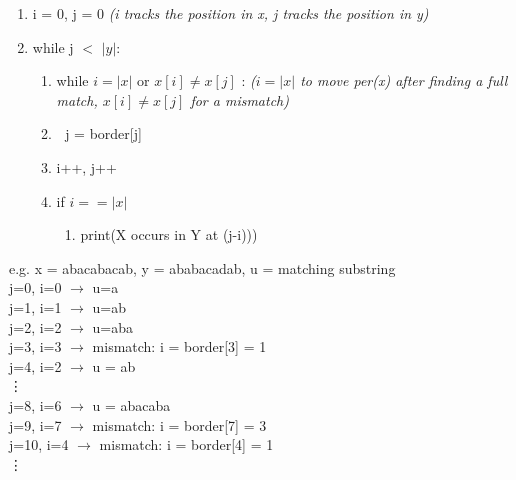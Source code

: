 \begin{enumerate}[label=\Alph*]
    \item i = 0, j = 0 \emph{(i tracks the position in x, j tracks the position in y)}
    \item while j $<$ $|y|$:
\begin{enumerate}[label=\arabic*]
    \item while $i=|x|$ or $x[i]\neq x[j]$ : \emph{($i=|x|$ to move per(x) after finding a full match, $x[i]\neq x[j]$ for a mismatch)}
    \item[ ] $\;$ j = border[j]    
    \item i++, j++
    \item if $i==|x|$
    \begin{enumerate}
        \item print(X occurs in Y at (j-i)))
    \end{enumerate}
\end{enumerate}    
\end{enumerate}
e.g.
x = abacabacab, y = ababacadab, u = matching substring \\
j=0, i=0 $\rightarrow$ u=a \\
j=1, i=1 $\rightarrow$ u=ab \\
j=2, i=2 $\rightarrow$ u=aba \\
j=3, i=3 $\rightarrow$ mismatch: i = border[3] = 1 \\
j=4, i=2 $\rightarrow$ u = ab \\
\vdots \\
j=8, i=6 $\rightarrow$ u = abacaba \\
j=9, i=7  $\rightarrow$ mismatch: i = border[7] = 3 \\
j=10, i=4 $\rightarrow$ mismatch: i = border[4] = 1 \\
\vdots


